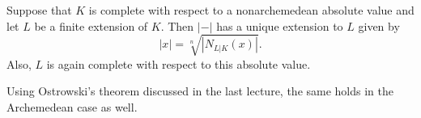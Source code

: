 \begin{theorem}
  Suppose that $K$ is complete with respect to a nonarchemedean absolute value and let $L$ be a finite extension of $K$.
  Then $|-|$ has a unique extension to $L$ given by
  \[ |x| = \sqrt[n]{|N_{L|K}(x)|}. \]
  Also, $L$ is again complete with respect to this absolute value.
\end{theorem}
\begin{remark}
  Using Ostrowski's theorem discussed in the last lecture, the same holds in the Archemedean case as well.
\end{remark}

